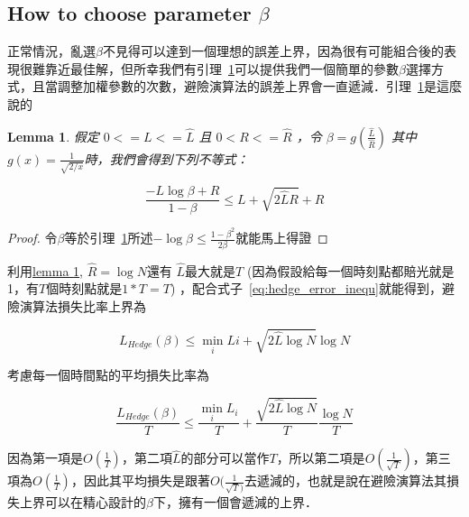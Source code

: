 \documentclass[12pt]{report}
\newtheorem{lemma}{Lemma}
\numberwithin{equation}{section}
\begin{document}
\begin{CJK}{UTF8}{bsmi}
\section{How to choose parameter $\beta$}

正常情況，亂選$\beta$不見得可以達到一個理想的誤差上界，因為很有可能組合後的表現很難靠近最佳解，但所幸我們有引理~\ref{lemma:best_beta_for_hedge}可以提供我們一個簡單的參數$\beta$選擇方式，且當調整加權參數的次數，避險演算法的誤差上界會一直遞減．引理~\ref{lemma:best_beta_for_hedge}是這麼說的

\begin{lemma}
\label{lemma:best_beta_for_hedge}
假定 $0<= L <= \hat{L}$ 且 $0 < R <= \hat{R}$ ，令 $\beta = g(\frac{\hat{L}}{\hat{R}})$ 其中 $g(x) =\frac{1}{\sqrt{2/x}} $時，我們會得到下列不等式：

\begin{equation}
\label{eq:hedge_error_inequ}
\frac{-L \log \beta + R}{1-\beta} \leq L + \sqrt{2\hat{L}{R}}+R
\end{equation}
\end{lemma}
\begin{proof}

令$\beta$等於引理~\ref{lemma:best_beta_for_hedge}所述$-\log\beta \leq \frac{1-\beta^2}{2\beta}$就能馬上得證
\end {proof}

利用\hyperref[lemma:best_beta_for_hedge]{lemma \ref*{lemma:best_beta_for_hedge}}, $\hat{R} = \log N$還有 $\hat{L}$最大就是$T$ (因為假設給每一個時刻點都賠光就是1，有$T$個時刻點就是$1 * T = T$) ，配合式子~\ref{eq:hedge_error_inequ}就能得到，避險演算法損失比率上界為

\[ L_{Hedge}(\beta) \leq \min_i Li + \sqrt{2\hat{L}\log N} \log N\]


考慮每一個時間點的平均損失比率為

\[ \frac{L_{Hedge}(\beta)}{T} \leq \frac{\min_i L_i}{T} + \frac{\sqrt{2\hat{L}\log N}}{T} \frac{\log N}{T}\]


因為第一項是$O(\frac{1}{T})$，第二項$\hat{L}$的部分可以當作$T$，所以第二項是$O(\frac{1}{\sqrt{T}})$，第三項為$O(\frac{1}{T})$，因此其平均損失是跟著$O(\frac{1}{\sqrt{T})}$去遞減的，也就是說在避險演算法其損失上界可以在精心設計的$\beta$下，擁有一個會遞減的上界．



	
	
\end{CJK} 
\end{document}
